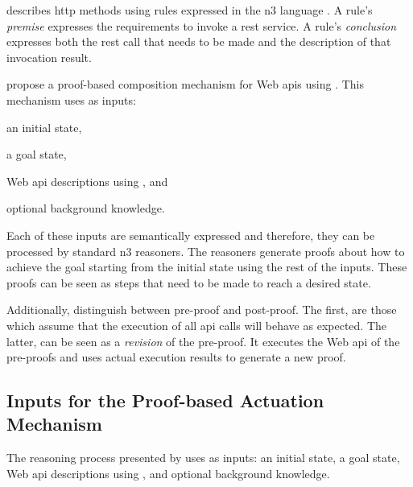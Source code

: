 \restdesc{} describes \acs{http} methods using rules expressed in the \ac{n3} language .
A rule's \emph{premise} expresses the requirements to invoke a \ac{rest} service.
A rule's \emph{conclusion} expresses both the \ac{rest} call that needs to be made and the description of that invocation result.


\citet{verborgh_ijcs_2014} propose a proof-based composition mechanism for Web \acp{api} using \restdesc{}.
This mechanism uses as inputs:
\begin{enumerate*}[label=\itshape(\arabic*\upshape)]
  \item an initial state,
  \item a goal state,
  \item Web \ac{api} descriptions using \restdesc{}, and
  \item optional background knowledge.
\end{enumerate*}
Each of these inputs are semantically expressed and therefore, they can be processed by standard \ac{n3} reasoners.
The reasoners generate proofs about how to achieve the goal starting from the initial state using the rest of the inputs.
These proofs can be seen as steps that need to be made to reach a desired state.


Additionally, \citet{verborgh_ijcs_2014} distinguish between pre-proof and post-proof.
The first, are those which assume that the execution of all \acs{api} calls will behave as expected.
The latter, can be seen as a \emph{revision} of the pre-proof.
It executes the Web \acs{api} of the pre-proofs and uses actual execution results to generate a new proof.



\subsection{Inputs for the Proof-based Actuation Mechanism}
\label{sec:inputs_proof}

The reasoning process presented by \citet{verborgh_ijcs_2014} uses as inputs: %
an initial state,
a goal state,
Web \ac{api} descriptions using \restdesc{}, and
optional background knowledge.


